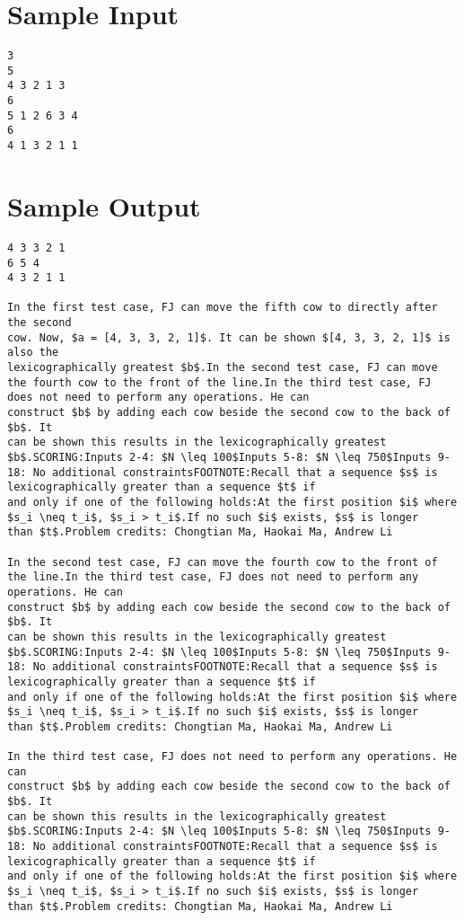 \documentclass[12pt]{article}
\begin{document}
\section*{Sample Input}
\begin{verbatim}
3
5
4 3 2 1 3
6
5 1 2 6 3 4
6
4 1 3 2 1 1
\end{verbatim}

\section*{Sample Output}
\begin{verbatim}
4 3 3 2 1
6 5 4
4 3 2 1 1

In the first test case, FJ can move the fifth cow to directly after the second
cow. Now, $a = [4, 3, 3, 2, 1]$. It can be shown $[4, 3, 3, 2, 1]$ is also the
lexicographically greatest $b$.In the second test case, FJ can move the fourth cow to the front of the line.In the third test case, FJ does not need to perform any operations. He can
construct $b$ by adding each cow beside the second cow to the back of $b$. It
can be shown this results in the lexicographically greatest $b$.SCORING:Inputs 2-4: $N \leq 100$Inputs 5-8: $N \leq 750$Inputs 9-18: No additional constraintsFOOTNOTE:Recall that a sequence $s$ is lexicographically greater than a sequence $t$ if
and only if one of the following holds:At the first position $i$ where
$s_i \neq t_i$, $s_i > t_i$.If no such $i$ exists, $s$ is longer
than $t$.Problem credits: Chongtian Ma, Haokai Ma, Andrew Li

In the second test case, FJ can move the fourth cow to the front of the line.In the third test case, FJ does not need to perform any operations. He can
construct $b$ by adding each cow beside the second cow to the back of $b$. It
can be shown this results in the lexicographically greatest $b$.SCORING:Inputs 2-4: $N \leq 100$Inputs 5-8: $N \leq 750$Inputs 9-18: No additional constraintsFOOTNOTE:Recall that a sequence $s$ is lexicographically greater than a sequence $t$ if
and only if one of the following holds:At the first position $i$ where
$s_i \neq t_i$, $s_i > t_i$.If no such $i$ exists, $s$ is longer
than $t$.Problem credits: Chongtian Ma, Haokai Ma, Andrew Li

In the third test case, FJ does not need to perform any operations. He can
construct $b$ by adding each cow beside the second cow to the back of $b$. It
can be shown this results in the lexicographically greatest $b$.SCORING:Inputs 2-4: $N \leq 100$Inputs 5-8: $N \leq 750$Inputs 9-18: No additional constraintsFOOTNOTE:Recall that a sequence $s$ is lexicographically greater than a sequence $t$ if
and only if one of the following holds:At the first position $i$ where
$s_i \neq t_i$, $s_i > t_i$.If no such $i$ exists, $s$ is longer
than $t$.Problem credits: Chongtian Ma, Haokai Ma, Andrew Li


\end{verbatim}
\end{document}
